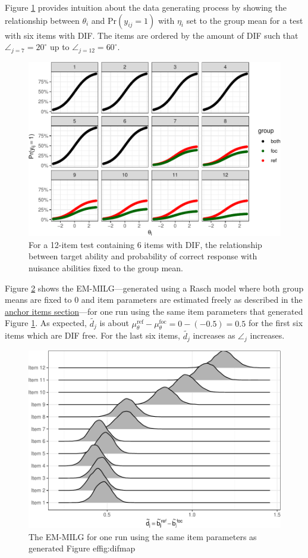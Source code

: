 \documentclass[
  11pt,
]{article}
\begin{document}
Figure \ref{fig:difmap} provides intuition about the data generating process by showing the relationship between \(\theta_i\) and \(\text{Pr}(y_{ij} = 1)\) with \(\eta_i\) set to the group mean for a test with six items with DIF. The items are ordered by the amount of DIF such that \(\angle_{j = 7} = 20^\circ\) up to \(\angle_{j = 12} = 60^\circ\).

\begin{figure}[H]

{\centering \includegraphics[width=0.7\linewidth]{paper_files/figure-latex/difmap-1} 

}

\caption{For a 12-item test containing 6 items with DIF, the relationship between target ability and probability of correct response with nuisance abilities fixed to the group mean.}\label{fig:difmap}
\end{figure}

Figure \ref{fig:simemmlg} shows the EM-MILG---generated using a Rasch model where both group means are fixed to 0 and item parameters are estimated freely as described in the \protect\hyperlink{anchoritems}{anchor items section}---for one run using the same item parameters that generated Figure \ref{fig:difmap}. As expected, \(\tilde{d_j}\) is about \(\mu_\theta^\text{ref} - \mu_\theta^\text{foc}= 0 - (-0.5) = 0.5\) for the first six items which are DIF free. For the last six items, \(\tilde{d_j}\) increases as \(\angle_j\) increases.

\begin{figure}[H]

{\centering \includegraphics[width=0.7\linewidth]{paper_files/figure-latex/simemmlg-1} 

}

\caption{The EM-MILG for one run using the same item parameters as generated Figure ef{fig:difmap}}\label{fig:simemmlg}
\end{figure}
\end{document}
